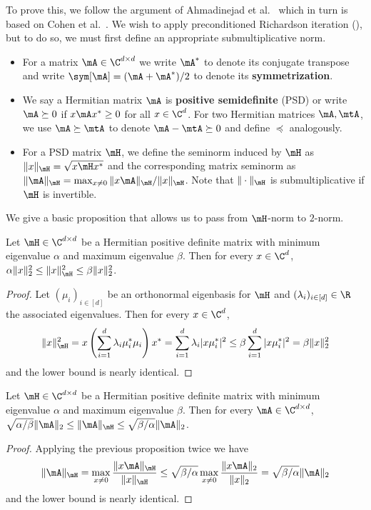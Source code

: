 \documentclass{toc}
\begin{document}
To prove this, we follow the argument of %
Ahmadinejad %
et al.~\cite{AhmadinejadKeMuPeSiVa19} which in turn is based on Cohen et al.~\cite{CKPPRSV17}. We wish to apply preconditioned Richardson iteration (), but to do so, we must first define an appropriate submultiplicative
%
norm. 
\begin{itemize}
        \item For a matrix $\mA \in \C^{d \times d}$ we write $\mA^*$ to denote its conjugate transpose and write $\sym[\mA]=(\mA+\mA^*)/2$ to denote its \textbf{symmetrization}.
        \item We say a Hermitian matrix $\mA$ is \textbf{positive semidefinite} (PSD) or write $\mA \succeq 0$ if $x\mA x^*\geq 0$ for all $x \in \C^d$. For two Hermitian matrices $\mA, \mtA$, we use $\mA\succeq \mtA$ to denote $\mA-\mtA\succeq 0$ and define $\preceq$ analogously.
        \item For a PSD matrix $\mH$, we define the seminorm induced by $\mH$ as $\|x\|_\mH=\sqrt{x\mH x^*}$ and the corresponding matrix seminorm as $\|\mA\|_{\mH} = \max_{x\neq 0}\|x\mA \|_{\mH}/\|x\|_{\mH}$. Note that $\|\cdot\|_{\mH}$ is submultiplicative if $\mH$ is invertible. 
    \end{itemize}
    We give a basic proposition that allows us to pass from $\mH$-norm to $2$-norm.
    \begin{proposition}
        Let $\mH\in \C^{d\times d}$ be a Hermitian positive definite matrix with minimum eigenvalue $\alpha$ and maximum eigenvalue $\beta$. Then for every $x \in \C^d$, $\alpha \|x\|_2^2\leq \|x\|^2_\mH\leq \beta\|x\|_2^2$.
    \end{proposition}
    \begin{proof}
    Let $(\mu_i)_{i\in[d]}$ be an orthonormal eigenbasis for $\mH$ and $(\lambda_i)_{i\in [d]} \in \R$ the associated eigenvalues. Then for every $x\in \C^d$,  
    \[\|x\|^2_\mH = x\left(\sum_{i=1}^d\lambda_i\mu_i^*\mu_i\right)x^*  = \sum_{i=1}^d \lambda_i |x\mu_i^*|^2 \leq \beta \sum_{i=1}^d |x\mu_i^*|^2=\beta \|x\|_2^2\]
    and the lower bound is nearly identical.
    \end{proof}
    \begin{corollary}\label{prop:condNumber}
        Let $\mH\in \C^{d\times d}$ be a Hermitian positive definite matrix with minimum eigenvalue $\alpha$ and maximum eigenvalue $\beta$. Then for every $\mA \in \C^{d\times d}$, $\sqrt{\alpha/\beta}\|\mA\|_2\leq \|\mA\|_\mH\leq \sqrt{\beta/\alpha}\|\mA\|_2$.
    \end{corollary}
    \begin{proof}
    Applying the previous proposition twice we have
    \[\|\mA\|_{\mH} = \max_{x\neq 0}\frac{\|x\mA\|_{\mH}}{\|x\|_{\mH}}\leq \sqrt{\beta/\alpha}\max_{x\neq 0}\frac{\|x\mA\|_2}{\|x\|_2} = \sqrt{\beta/\alpha}\|\mA\|_2\]
    and the lower bound is nearly identical.
    \end{proof}
    
\end{document}
